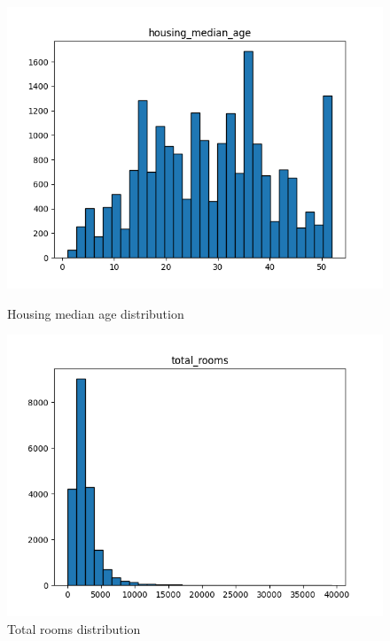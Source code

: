 \documentclass[a4paper, 11pt]{article}
\begin{document}
\begin{figure}[htbp]
    \vspace{0.1cm}  %
    
    \begin{minipage}{0.45\textwidth}
        \centering
        \includegraphics[width=\linewidth]{figs/housing_median_age_distribution.png}
        \caption{Housing median age distribution}
        \label{fig:housing_age_distribution}
    \end{minipage}\hfill
    \begin{minipage}{0.45\textwidth}
        \centering
        \includegraphics[width=\linewidth]{figs/total_rooms_distribution.png}
        \caption{Total rooms distribution}
        \label{fig:total_rooms_distribution}
    \end{minipage}
    

\end{figure}
\end{document}
